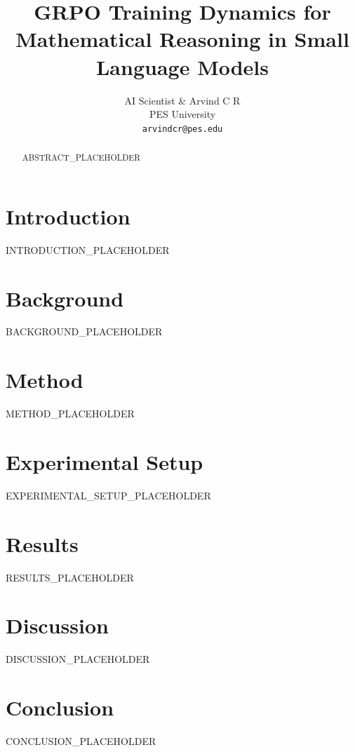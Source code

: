 \documentclass{article}
\title{GRPO Training Dynamics for Mathematical Reasoning in Small Language Models}
\author{AI Scientist \& Arvind C R \\
PES University \\
\texttt{arvindcr@pes.edu}}
\begin{document}
\maketitle

\begin{abstract}
ABSTRACT_PLACEHOLDER
\end{abstract}

\section{Introduction}
\label{sec:intro}
INTRODUCTION_PLACEHOLDER

\section{Background}
\label{sec:background}
BACKGROUND_PLACEHOLDER

\section{Method}
\label{sec:method}
METHOD_PLACEHOLDER

\section{Experimental Setup}
\label{sec:setup}
EXPERIMENTAL_SETUP_PLACEHOLDER

\section{Results}
\label{sec:results}
RESULTS_PLACEHOLDER

\section{Discussion}
\label{sec:discussion}
DISCUSSION_PLACEHOLDER

\section{Conclusion}
\label{sec:conclusion}
CONCLUSION_PLACEHOLDER



\end{document}
